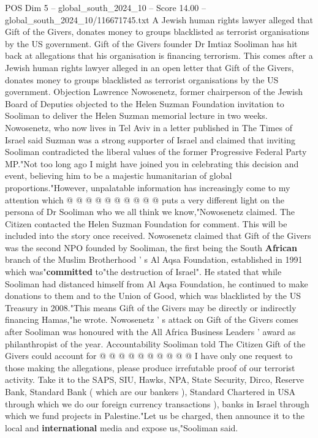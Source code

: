 \begin{textsample}{POS Dim 5 – global\_south\_2024\_10 – Score 14.00 – global\_south\_2024\_10/116671745.txt}  \label{ex:f5_pos_348}
A Jewish human rights lawyer alleged that Gift of the Givers, donates money to groups blacklisted as terrorist organisations by the US government.
Gift of the Givers founder Dr Imtiaz Sooliman has hit back at allegations that his organisation is financing terrorism.
This comes after a Jewish human rights lawyer alleged in an open letter that Gift of the Givers, donates money to groups blacklisted as terrorist organisations by the US government.
Objection Lawrence Nowosenetz, former chairperson of the Jewish Board of Deputies objected to the Helen Suzman Foundation invitation to Sooliman to deliver the Helen Suzman memorial lecture in two weeks.
Nowosenetz, who now lives in Tel Aviv in a letter published in The Times of Israel said Suzman was a strong supporter of Israel and claimed that inviting Sooliman contradicted the liberal values of the former Progressive Federal Party MP."Not too long ago I might have joined you in celebrating this decision and event, believing him to be a majestic humanitarian of global proportions."However, unpalatable information has increasingly come to my attention which @ @ @ @ @ @ @ @ @ @ puts a very different light on the persona of Dr Sooliman who we all think we know,"Nowosenetz claimed.
The Citizen contacted the Helen Suzman Foundation for comment.
This will be included into the story once received.
Nowosenetz claimed that Gift of the Givers was the second NPO founded by Sooliman, the first being the South \textbf{African} branch of the Muslim Brotherhood ' s Al Aqsa Foundation, established in 1991 which was"\textbf{committed} to"the destruction of Israel".
He stated that while Sooliman had distanced himself from Al Aqsa Foundation, he continued to make donations to them and to the Union of Good, which was blacklisted by the US Treasury in 2008."This means Gift of the Givers may be directly or indirectly financing Hamas,"he wrote.
Nowosenetz ' s attack on Gift of the Givers comes after Sooliman was honoured with the All Africa Business Leaders ' award as philanthropist of the year.
Accountability Sooliman told The Citizen Gift of the Givers could account for @ @ @ @ @ @ @ @ @ @ I have only one request to those making the allegations, please produce irrefutable proof of our terrorist activity.
Take it to the SAPS, SIU, Hawks, NPA, State Security, Dirco, Reserve Bank, Standard Bank ( which are our bankers ), Standard Chartered in USA through which we do our foreign currency transactions ), banks in Israel through which we fund projects in Palestine."Let us be charged, then announce it to the local and \textbf{international} media and expose us,"Sooliman said.

\end{textsample}
